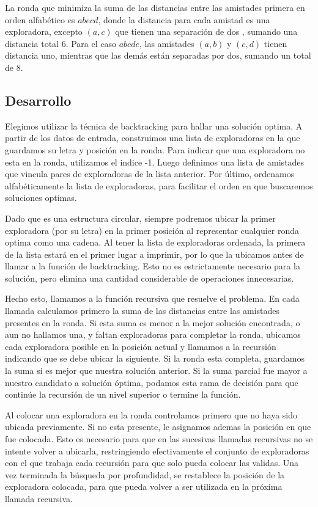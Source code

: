 La ronda que minimiza la suma de las distancias entre las amistades primera en orden alfabético es $abecd$, donde la distancia para cada amistad es una exploradora, excepto $(a,c)$ que tienen una separación de dos , sumando una distancia total $6$. Para el caso $abcde$, las amistades $(a,b)$ y $(c,d)$ tienen distancia uno, mientras que las demás están separadas por dos, sumando un total de $8$.


\subsection{Desarrollo}
Elegimos utilizar la técnica de backtracking para hallar una solución optima.
A partir de los datos de entrada, construimos una lista de exploradoras en la que guardamos su letra y posición en la ronda. Para indicar que una exploradora no esta en la ronda, utilizamos el indice -1.
Luego definimos una lista de amistades que vincula pares de exploradoras de la lista anterior.
Por último, ordenamos alfabéticamente la lista de exploradoras, para facilitar el orden en que buscaremos soluciones optimas.

Dado que es una estructura circular, siempre podremos ubicar la primer exploradora (por su letra) en la primer posición al representar cualquier ronda optima como una cadena. Al tener la lista de exploradoras ordenada, la primera de la lista estará en el primer lugar a imprimir, por lo que la ubicamos antes de llamar a la función de backtracking. Esto no es estrictamente necesario para la solución, pero elimina una cantidad considerable de operaciones innecesarias.

\newpage

Hecho esto, llamamos a la función recursiva que resuelve el problema.
En cada llamada calculamos primero la suma de las distancias entre las amistades presentes en la ronda. Si esta suma es menor a la mejor solución encontrada, o aun no hallamos una, y faltan exploradoras para completar la ronda, ubicamos cada exploradora posible en la posición actual y llamamos a la recursión indicando que se debe ubicar la siguiente. Si la ronda esta completa, guardamos la suma si es mejor que nuestra solución anterior. Si la suma parcial fue mayor a nuestro candidato a solución óptima, podamos esta rama de decisión para que continúe la recursión de un nivel superior o termine la función.

Al colocar una exploradora en la ronda controlamos primero que no haya sido ubicada previamente. Si no esta presente, le asignamos ademas la posición en que fue colocada. Esto es necesario para que en las sucesivas llamadas recursivas no se intente volver a ubicarla, restringiendo efectivamente el conjunto de exploradoras con el que trabaja cada recursión para que solo pueda colocar las validas.
Una vez terminada la búsqueda por profundidad, se restablece la posición de la exploradora colocada, para que pueda volver a ser utilizada en la próxima llamada recursiva.

